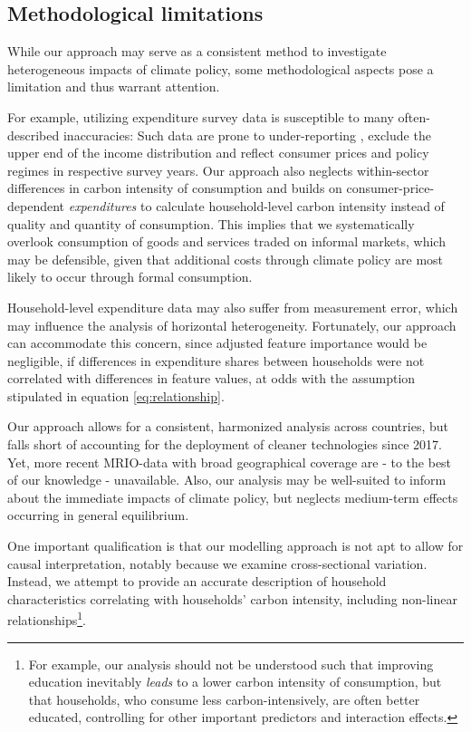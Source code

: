 \documentclass[12pt, a4paper]{article}
\begin{document}
\subsection{Methodological limitations}

While our approach may serve as a consistent method to investigate heterogeneous impacts of climate policy, some methodological aspects pose a limitation and thus warrant attention.

For example, utilizing expenditure survey data is susceptible to many often-described inaccuracies: Such data are prone to under-reporting \autocite{Meyer.2015}, exclude the upper end of the income distribution \autocite{Blanchet.2022} and reflect consumer prices and policy regimes in respective survey years. Our approach also neglects within-sector differences in carbon intensity of consumption and builds on consumer-price-dependent \textit{expenditures} to calculate household-level carbon intensity instead of quality and quantity of consumption. This implies that we systematically overlook consumption of goods and services traded on informal markets, which may be defensible, given that additional costs through climate policy are most likely to occur through formal consumption.

Household-level expenditure data may also suffer from measurement error, which may influence the analysis of horizontal heterogeneity. Fortunately, our approach can accommodate this concern, since adjusted feature importance would be negligible, if differences in expenditure shares between households were not correlated with differences in feature values, at odds with the assumption stipulated in equation \ref{eq:relationship}.

Our approach allows for a consistent, harmonized analysis across countries, but falls short of accounting for the deployment of cleaner technologies since 2017. Yet, more recent MRIO-data with broad geographical coverage are - to the best of our knowledge - unavailable. Also, our analysis may be well-suited to inform about the immediate impacts of climate policy, but neglects medium-term effects occurring in general equilibrium. 

One important qualification is that our modelling approach is not apt to allow for causal interpretation, notably because we examine cross-sectional variation. Instead, we attempt to provide an accurate description of household characteristics correlating with households' carbon intensity, including non-linear relationships\footnote{For example, our analysis should not be understood such that improving education inevitably \textit{leads} to a lower carbon intensity of consumption, but that households, who consume less carbon-intensively, are often better educated, controlling for other important predictors and interaction effects.}.
\end{document}
